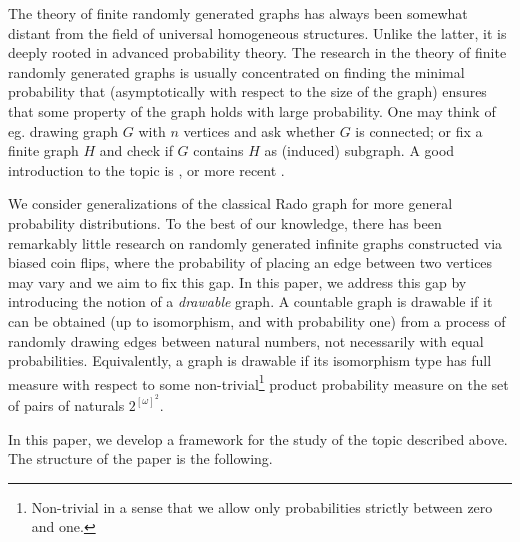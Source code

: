 \documentclass{amsart}
\theoremstyle{plain}
\theoremstyle{definition}
\theoremstyle{remark}
\numberwithin{equation}{section}
\begin{document}
The theory of finite randomly generated graphs has always been somewhat distant from the field of universal homogeneous structures. Unlike the latter, it is deeply rooted in advanced probability theory. The research in the theory of finite randomly generated graphs is usually concentrated on finding the minimal probability that (asymptotically with respect to
the size of the graph) ensures that some property of the graph holds with large probability. One may think of eg. drawing graph $G$ with $n$ vertices and ask whether $G$ is connected; or fix a finite graph $H$ and check if $G$ contains $H$ as (induced) subgraph. A good introduction to the topic is \cite{janson_random_graphs}, or more recent \cite{frieze2015introduction}.

We consider generalizations of the classical Rado graph  for more general probability distributions. To the best of our knowledge, there has been remarkably little research on randomly generated infinite graphs constructed via biased coin flips, where the probability of placing an edge between two vertices may vary and we aim to fix this gap.  In this paper, we address this gap by introducing the notion of a \emph{drawable} graph. A countable graph is drawable if it can be obtained (up to isomorphism, and with probability one) from a process of randomly drawing edges between natural numbers, not necessarily with equal probabilities. 
Equivalently, a graph is drawable if its isomorphism type has full measure with respect to some non-trivial\footnote{Non-trivial in a sense that we allow only probabilities strictly between zero and one.} product probability measure on the set of pairs of naturals $2^{[\omega]^2}$. 

In this paper, we develop a framework for the study of the topic described above. The structure of the paper is the following.
\end{document}
